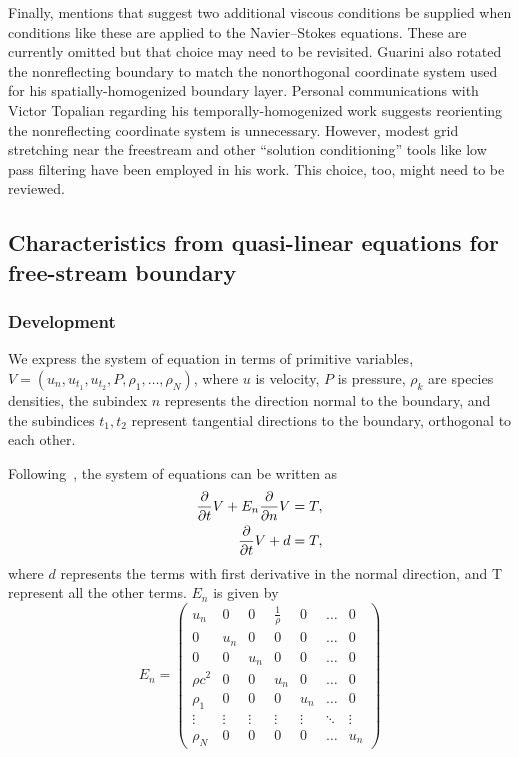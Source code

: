 Finally, \citet{Guarini1998} mentions that \citet{Poinsot1992Boundary}
suggest two additional viscous conditions be supplied when conditions like
these are applied to the Navier--Stokes equations.  These are currently omitted
but that choice may need to be revisited.  Guarini also rotated the
nonreflecting boundary to match the nonorthogonal coordinate system used for
his spatially-homogenized boundary layer.  Personal communications with Victor
Topalian regarding his temporally-homogenized work suggests reorienting the
nonreflecting coordinate system is unnecessary.  However, modest grid
stretching near the freestream and other ``solution conditioning'' tools like
low pass filtering have been employed in his work.  This choice, too, might
need to be reviewed.



\subsection{Characteristics from quasi-linear equations for free-stream boundary}
\subsubsection{Development}
We express the system of equation in terms of primitive variables, 
$V=(u_n, u_{t_1}, u_{t_2}, P, \rho_1, \ldots, \rho_N)$, where $u$ is velocity,
$P$ is pressure, $\rho_k$ are species densities, the subindex $n$ represents the
direction normal to the boundary, and the subindices $t_1, t_2$ represent 
tangential directions to the boundary, orthogonal to each other.

Following~\citet{Moureau2005Numerical}, the system of equations can be written
as
%
\begin{align}
  \frac{\partial }{\partial t}V
  + E_n \frac{\partial }{\partial n}V
  &= T, \\
  \frac{\partial }{\partial t}V
  + d
  &= T,
\end{align}
%
where $d$ represents the terms with first derivative in the normal direction, 
and T represent all the other terms. $E_n$ is given by
\begin{equation}
E_n =
\left(
\begin{array}{ccccccc}
 u_n & 0 & 0 & \frac{1}{\rho} & 0 & \ldots & 0 \\
 0 & u_n & 0 & 0 & 0 & \ldots & 0 \\
 0 & 0 & u_n & 0 & 0 & \ldots & 0 \\
 \rho c^2 & 0 & 0 & u_n & 0 & \ldots & 0 \\
 \rho_1 & 0 & 0 & 0 & u_n & \ldots & 0 \\
 \vdots & \vdots & \vdots & \vdots & \vdots & \ddots & \vdots \\
 \rho_N & 0 & 0 & 0 & 0 & \ldots & u_n
\end{array}
\right)
\end{equation}

